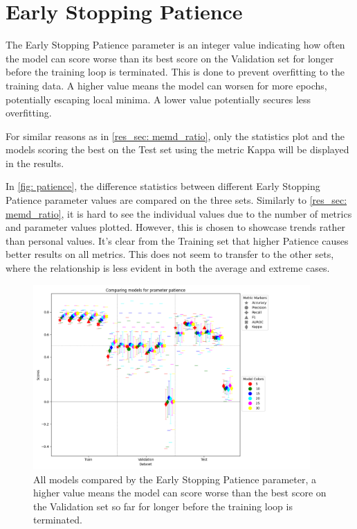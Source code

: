 \section{Early Stopping Patience}
The Early Stopping Patience parameter is an integer value indicating how often the model can score worse than its best score on the Validation set for longer before the training loop is terminated. This is done to prevent overfitting to the training data. A higher value means the model can worsen for more epochs, potentially escaping local minima. A lower value potentially secures less overfitting.

For similar reasons as in \autoref{res_sec: memd_ratio}, only the statistics plot and the models scoring the best on the Test set using the metric Kappa will be displayed in the results. 

In \autoref{fig: patience}, the difference statistics between different Early Stopping Patience parameter values are compared on the three sets. Similarly to \autoref{res_sec: memd_ratio}, it is hard to see the individual values due to the number of metrics and parameter values plotted. However, this is chosen to showcase trends rather than personal values. It's clear from the Training set that higher Patience causes better results on all metrics. This does not seem to transfer to the other sets, where the relationship is less evident in both the average and extreme cases.


\begin{figure}[H]
    \centering
    \includegraphics[width=400px]{Figures/results/patience/patience.png}
    \caption{All models compared by the Early Stopping Patience parameter, a higher value means the model can score worse than the best score on the Validation set so far for longer before the training loop is terminated.}
    \label{fig: patience}
\end{figure}


